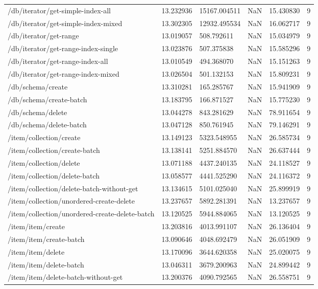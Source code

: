 \begin{tabularx}{\linewidth}{XXXXXX}
/db/iterator/get-simple-index-all & 13.232936 & 15167.004511 & NaN & 15.430830 & 9 \\
/db/iterator/get-simple-index-mixed & 13.302305 & 12932.495534 & NaN & 16.062717 & 9 \\
/db/iterator/get-range & 13.019057 & 508.792611 & NaN & 15.034979 & 9 \\
/db/iterator/get-range-index-single & 13.023876 & 507.375838 & NaN & 15.585296 & 9 \\
/db/iterator/get-range-index-all & 13.010549 & 494.368070 & NaN & 15.151263 & 9 \\
/db/iterator/get-range-index-mixed & 13.026504 & 501.132153 & NaN & 15.809231 & 9 \\
/db/schema/create & 13.310281 & 165.285767 & NaN & 15.941909 & 9 \\
/db/schema/create-batch & 13.183795 & 166.871527 & NaN & 15.775230 & 9 \\
/db/schema/delete & 13.044278 & 843.281629 & NaN & 78.911654 & 9 \\
/db/schema/delete-batch & 13.047128 & 850.761945 & NaN & 79.146291 & 9 \\
/item/collection/create & 13.149123 & 5323.548955 & NaN & 26.585734 & 9 \\
/item/collection/create-batch & 13.138141 & 5251.884570 & NaN & 26.637444 & 9 \\
/item/collection/delete & 13.071188 & 4437.240135 & NaN & 24.118527 & 9 \\
/item/collection/delete-batch & 13.058577 & 4441.525290 & NaN & 24.116372 & 9 \\
/item/collection/delete-batch-without-get & 13.134615 & 5101.025040 & NaN & 25.899919 & 9 \\
/item/collection/unordered-create-delete & 13.237657 & 5892.281391 & NaN & 13.237657 & 9 \\
/item/collection/unordered-create-delete-batch & 13.120525 & 5944.884065 & NaN & 13.120525 & 9 \\
/item/item/create & 13.203816 & 4013.991107 & NaN & 26.136404 & 9 \\
/item/item/create-batch & 13.090646 & 4048.692479 & NaN & 26.051909 & 9 \\
/item/item/delete & 13.170096 & 3644.620358 & NaN & 25.020075 & 9 \\
/item/item/delete-batch & 13.046311 & 3679.200963 & NaN & 24.899442 & 9 \\
/item/item/delete-batch-without-get & 13.200376 & 4090.792565 & NaN & 26.558751 & 9 \\

\end{tabularx}
